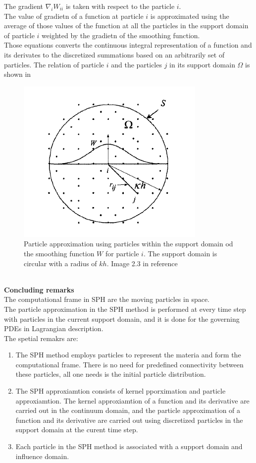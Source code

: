 \documentclass[12pt]{thesis}
\begin{document}
The gradient $\nabla_i W_{ii}$ is taken with respect to the particle $i$.\\
The value of gradietn of a function at particle $i$ is approximated using the average of those values of the function at all the particles in the support domain of particle $i$ weighted by the gradietn of the smoothing function.\\
Those equations converts the continuous integral representation of a function and its derivates to the discretized summations based on an arbitrarily set of particles.
The relation of particle $i$ and the particles $j$ in its support domain $\Omega$ is shown in
\begin{figure}[h!]
\centering
\includegraphics[scale=.8]{./images/ParticleApprox.png}
\caption{Particle approximation using particles within the support domain od the smoothing function $W$ for particle $i$. The support domain is circular with a radius of $kh$. Image 2.3 in reference \cite{Liu_SPH}}
\label{ParticleApprox}
\end{figure}
\\\textbf{Concluding remarks}\\
The computational frame in SPH are the moving particles in space.\\
The particle approximation in the SPH method is performed at every time step with particles in the current support domain, and it is done for the governing PDEs in Lagrangian description.\\
The spetial remakrs are:
\begin{enumerate}
\item The SPH method employs particles to represent the materia and form the computational frame. There is no need for predefined connectivity between these particles, all one needs is the initial particle distribution.
\item The SPH approxiamtion consists of kernel pporximation and particle approxiamtion. The kernel approxiamtion of a function and its derivative are carried out in the continuum domain, and the particle approximation of a function and its derivative are carried out using discretized particles in the support domain at the curent time step.
\item Each particle in the SPH method is associated with a support domain and influence domain.
\end{enumerate}
\end{document}
